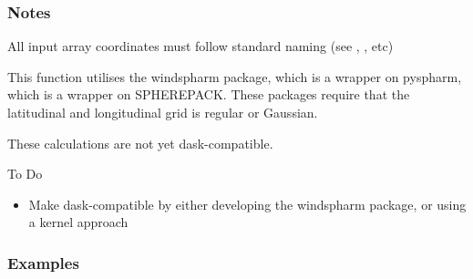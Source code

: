 \documentclass[letterpaper,10pt,english]{sphinxmanual}
\begin{document}
\begin{fulllineitems}
\subsubsection*{Notes}

\begin{DUlineblock}{0em}
\item[] All input array coordinates must follow standard naming (see ,                 , etc)
\item[] This function utilises the windspharm package, which is a wrapper on pyspharm, which is a                 wrapper on SPHEREPACK. These packages require that the latitudinal and longitudinal grid                 is regular or Gaussian.
\item[] These calculations are not yet dask-compatible.
\end{DUlineblock}

To Do
\begin{itemize}
\item {} 
Make dask-compatible by either developing the windspharm package, or using a kernel approach

\end{itemize}
\subsubsection*{Examples}


\end{fulllineitems}
\end{document}
